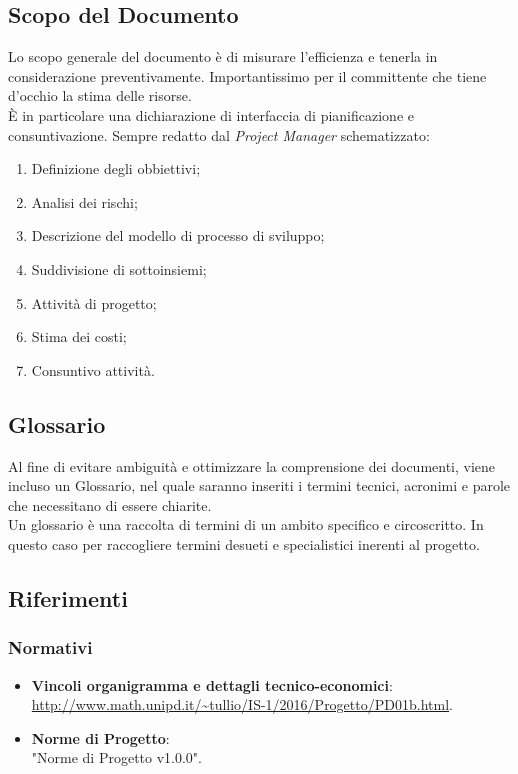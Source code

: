 \documentclass[12pt,a4paper,titlepage]{article}
\begin{document}
\subsection{Scopo del Documento}
Lo scopo generale del documento è di misurare l'efficienza e tenerla in considerazione preventivamente. Importantissimo per il committente che tiene d'occhio la stima delle risorse. \\
È in particolare una dichiarazione di interfaccia di pianificazione e consuntivazione. Sempre redatto dal \textit{Project Manager} schematizzato:
\begin{enumerate}
	\item Definizione degli obbiettivi;
	\item Analisi dei rischi;
	\item Descrizione del modello di processo di sviluppo;
	\item Suddivisione di sottoinsiemi;
	\item Attività di progetto;
	\item Stima dei costi;
	\item Consuntivo attività.
\end{enumerate} 

\subsection{Glossario}
Al fine di evitare ambiguità e ottimizzare la comprensione dei documenti, viene incluso un Glossario, nel quale saranno inseriti i termini tecnici, acronimi e parole che necessitano di essere chiarite.\\
Un glossario è una raccolta di termini di un ambito specifico e circoscritto. In questo caso per raccogliere termini desueti e specialistici inerenti al progetto. 

\subsection{Riferimenti}
\subsubsection{Normativi}
\begin{itemize}
	\item \textbf{Vincoli organigramma e dettagli tecnico-economici}: \\
	\textcolor{blue}{\url{http://www.math.unipd.it/~tullio/IS-1/2016/Progetto/PD01b.html}}.
	\item \textbf{Norme di Progetto}: \\
	"Norme di Progetto v1.0.0".
 \end{itemize}
\end{document}

